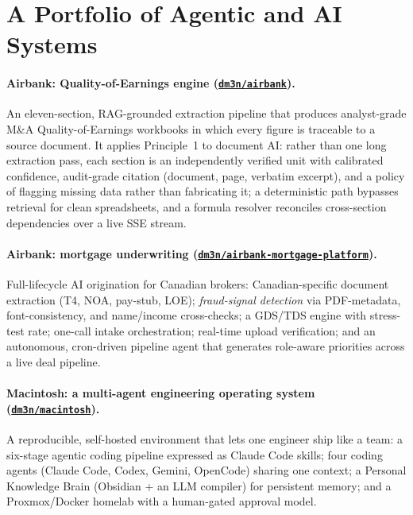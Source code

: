 \documentclass[11pt]{article}
\theoremstyle{plain}
\theoremstyle{definition}
\newcommand{\repo}[1]{\href{https://github.com/dm3n/#1}{\nolinkurl{dm3n/#1}}}
\begin{document}
\section{A Portfolio of Agentic and AI Systems}

\paragraph{Airbank: Quality-of-Earnings engine
(\repo{airbank}).} An eleven-section, RAG-grounded extraction pipeline that produces
analyst-grade M\&A Quality-of-Earnings workbooks in which every figure is traceable to a
source document. It applies Principle~1 to document AI: rather than one long extraction
pass, each section is an independently verified unit with calibrated confidence, audit-grade
citation (document, page, verbatim excerpt), and a policy of flagging missing data rather
than fabricating it; a deterministic path bypasses retrieval for clean spreadsheets, and a
formula resolver reconciles cross-section dependencies over a live SSE stream.

\paragraph{Airbank: mortgage underwriting
(\repo{airbank-mortgage-platform}).} Full-lifecycle AI origination for Canadian brokers:
Canadian-specific document extraction (T4, NOA, pay-stub, LOE); \emph{fraud-signal
detection} via PDF-metadata, font-consistency, and name/income cross-checks; a GDS/TDS
engine with stress-test rate; one-call intake orchestration; real-time upload verification;
and an autonomous, cron-driven pipeline agent that generates role-aware priorities across a
live deal pipeline.

\paragraph{Macintosh: a multi-agent engineering operating system
(\repo{macintosh}).} A reproducible, self-hosted environment that lets one engineer ship
like a team: a six-stage agentic coding pipeline expressed as Claude Code skills; four
coding agents (Claude Code, Codex, Gemini, OpenCode) sharing one context; a Personal
Knowledge Brain (Obsidian + an LLM compiler) for persistent memory; and a Proxmox/Docker
homelab with a human-gated approval model.
\end{document}
